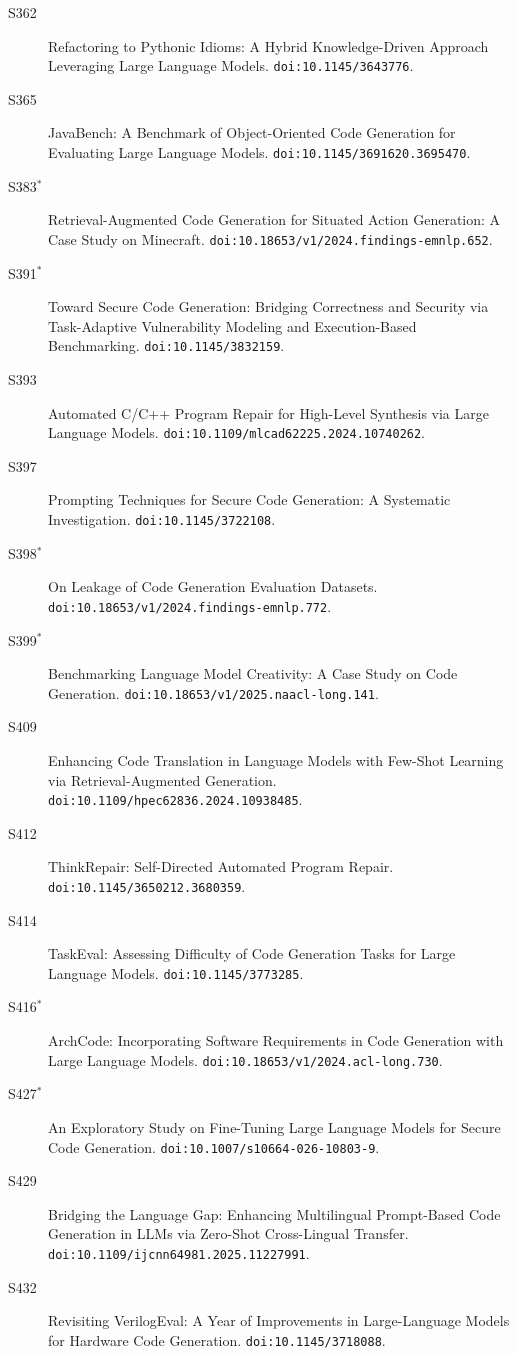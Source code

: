 {\begin{description}
\item[S362] Refactoring to Pythonic Idioms: A Hybrid Knowledge-Driven Approach Leveraging Large Language Models. \texttt{doi:10.1145/3643776}.
\item[S365] JavaBench: A Benchmark of Object-Oriented Code Generation for Evaluating Large Language Models. \texttt{doi:10.1145/3691620.3695470}.
\item[S383$^\ast$] Retrieval-Augmented Code Generation for Situated Action Generation: A Case Study on Minecraft. \texttt{doi:10.18653/v1/2024.findings-emnlp.652}.
\item[S391$^\ast$] Toward Secure Code Generation: Bridging Correctness and Security via Task-Adaptive Vulnerability Modeling and Execution-Based Benchmarking. \texttt{doi:10.1145/3832159}.
\item[S393] Automated C/C++ Program Repair for High-Level Synthesis via Large Language Models. \texttt{doi:10.1109/mlcad62225.2024.10740262}.
\item[S397] Prompting Techniques for Secure Code Generation: A Systematic Investigation. \texttt{doi:10.1145/3722108}.
\item[S398$^\ast$] On Leakage of Code Generation Evaluation Datasets. \texttt{doi:10.18653/v1/2024.findings-emnlp.772}.
\item[S399$^\ast$] Benchmarking Language Model Creativity: A Case Study on Code Generation. \texttt{doi:10.18653/v1/2025.naacl-long.141}.
\item[S409] Enhancing Code Translation in Language Models with Few-Shot Learning via Retrieval-Augmented Generation. \texttt{doi:10.1109/hpec62836.2024.10938485}.
\item[S412] ThinkRepair: Self-Directed Automated Program Repair. \texttt{doi:10.1145/3650212.3680359}.
\item[S414] TaskEval: Assessing Difficulty of Code Generation Tasks for Large Language Models. \texttt{doi:10.1145/3773285}.
\item[S416$^\ast$] ArchCode: Incorporating Software Requirements in Code Generation with Large Language Models. \texttt{doi:10.18653/v1/2024.acl-long.730}.
\item[S427$^\ast$] An Exploratory Study on Fine-Tuning Large Language Models for Secure Code Generation. \texttt{doi:10.1007/s10664-026-10803-9}.
\item[S429] Bridging the Language Gap: Enhancing Multilingual Prompt-Based Code Generation in LLMs via Zero-Shot Cross-Lingual Transfer. \texttt{doi:10.1109/ijcnn64981.2025.11227991}.
\item[S432] Revisiting VerilogEval: A Year of Improvements in Large-Language Models for Hardware Code Generation. \texttt{doi:10.1145/3718088}.

\end{description}}
